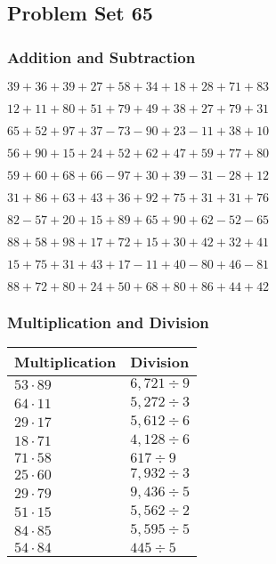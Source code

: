 \hypertarget{problem-set-65}{%
\subsection{Problem Set 65}\label{problem-set-65}}

\hypertarget{addition-and-subtraction}{%
\subsubsection{Addition and
Subtraction}\label{addition-and-subtraction}}

\(39+36+39+27+58+34+18+28+71+83\)

\(12+11+80+51+79+49+38+27+79+31\)

\(65+52+97+37-73-90+23-11+38+10\)

\(56+90+15+24+52+62+47+59+77+80\)

\(59+60+68+66-97+30+39-31-28+12\)

\(31+86+63+43+36+92+75+31+31+76\)

\(82-57+20+15+89+65+90+62-52-65\)

\(88+58+98+17+72+15+30+42+32+41\)

\(15+75+31+43+17-11+40-80+46-81\)

\(88+72+80+24+50+68+80+86+44+42\)

\hypertarget{multiplication-and-division}{%
\subsubsection{Multiplication and
Division}\label{multiplication-and-division}}

\begin{longtable}[]{@{}ll@{}}
\toprule
Multiplication & Division\tabularnewline
\midrule
\endhead
\(53\cdot89\) & \(6,721÷9\)\tabularnewline
\(64\cdot11\) & \(5,272÷3\)\tabularnewline
\(29\cdot17\) & \(5,612÷6\)\tabularnewline
\(18\cdot71\) & \(4,128÷6\)\tabularnewline
\(71\cdot58\) & \(617÷9\)\tabularnewline
\(25\cdot60\) & \(7,932÷3\)\tabularnewline
\(29\cdot79\) & \(9,436÷5\)\tabularnewline
\(51\cdot15\) & \(5,562÷2\)\tabularnewline
\(84\cdot85\) & \(5,595÷5\)\tabularnewline
\(54\cdot84\) & \(445÷5\)\tabularnewline
\bottomrule
\end{longtable}
